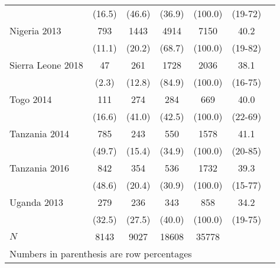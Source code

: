 \begin{tabular}{l*{6}{c}}
&                                              {(16.5)}&      {(46.6)}&             {(36.9)}&     {(100.0)}&       {(19-72)}\\
Nigeria 2013&                  {793}&                {1443}&           {4914}&       {7150}&         {40.2}\\
&                                              {(11.1)}&      {(20.2)}&             {(68.7)}&     {(100.0)}&       {(19-82)}\\
Sierra Leone 2018&             {47}&                {261}&           {1728}&       {2036}&         {38.1}\\
&                                              {(2.3)}&      {(12.8)}&             {(84.9)}&     {(100.0)}&       {(16-75)}\\
Togo 2014&                             {111}&               {274}&           {284}&       {669}&         {40.0}\\
&                                              {(16.6)}&     {(41.0)}&             {(42.5)}&     {(100.0)}&       {(22-69)}\\
Tanzania 2014&                 {785}&               {243}&           {550}&       {1578}&         {41.1}\\
&                                              {(49.7)}&     {(15.4)}&             {(34.9)}&     {(100.0)}&       {(20-85)}\\
Tanzania 2016&                 {842}&               {354}&           {536}&       {1732}&         {39.3}\\
&                                              {(48.6)}&     {(20.4)}&             {(30.9)}&     {(100.0)}&       {(15-77)}\\
Uganda 2013&                   {279}&               {236}&           {343}&       {858}&         {34.2}\\
&                                              {(32.5)}&     {(27.5)}&             {(40.0)}&     {(100.0)}&       {(19-75)}\\
\hline
\(N\)                          &       {8143}                &  {9027} &    {18608} &         {35778}\\
\hline\hline
\multicolumn{6}{l}{\footnotesize Numbers in parenthesis are row percentages}\\
\end{tabular}